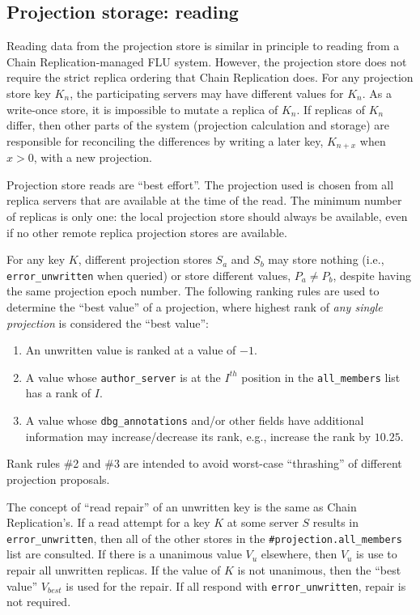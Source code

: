 \documentclass[preprint,10pt]{sigplanconf}
\begin{document}
\subsection{Projection storage: reading}
\label{sub:proj-storage-reading}

Reading data from the projection store is similar in principle to
reading from a Chain Replication-managed FLU system.  However, the
projection store does not require the strict replica ordering that
Chain Replication does.  For any projection store key $K_n$, the
participating servers may have different values for $K_n$.  As a
write-once store, it is impossible to mutate a replica of $K_n$.  If
replicas of $K_n$ differ, then other parts of the system (projection
calculation and storage) are responsible for reconciling the
differences by writing a later key,
$K_{n+x}$ when $x>0$, with a new projection.

Projection store reads are ``best effort''.  The projection used is chosen from
all replica servers that are available at the time of the read.  The
minimum number of replicas is only one: the local projection store
should always be available, even if no other remote replica projection
stores are available.

For any key $K$, different projection stores $S_a$ and $S_b$ may store
nothing (i.e., {\tt error\_unwritten} when queried) or store different
values, $P_a \ne P_b$, despite having the same projection epoch
number.  The following ranking rules are used to
determine the ``best value'' of a projection, where highest rank of
{\em any single projection} is considered the ``best value'':

\begin{enumerate}
\item An unwritten value is ranked at a value of $-1$.
\item A value whose {\tt author\_server} is at the $I^{th}$ position
  in the {\tt all\_members} list has a rank of $I$.
\item A value whose {\tt dbg\_annotations} and/or other fields have
  additional information may increase/decrease its rank, e.g.,
  increase the rank by $10.25$.
\end{enumerate}

Rank rules \#2 and \#3 are intended to avoid worst-case ``thrashing''
of different projection proposals.

The concept of ``read repair'' of an unwritten key is the same as
Chain Replication's.  If a read attempt for a key $K$ at some server
$S$ results in {\tt error\_unwritten}, then all of the other stores in
the {\tt \#projection.all\_members} list are consulted.  If there is a
unanimous value $V_{u}$ elsewhere, then $V_{u}$ is use to repair all
unwritten replicas.  If the value of $K$ is not unanimous, then the
``best value'' $V_{best}$ is used for the repair.  If all respond with
{\tt error\_unwritten}, repair is not required.
\end{document}
